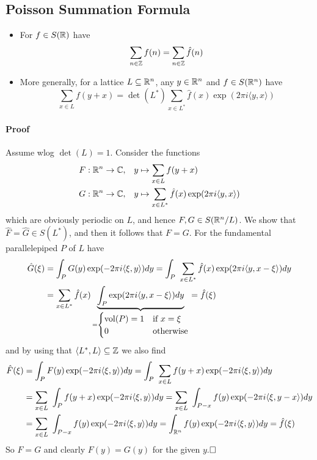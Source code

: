 \subsection{Poisson Summation Formula}
\begin{itemize}
    \item For $f \in S(\mathbb{R})$ have
    \begin{equation*}
        \sum_{n \in \mathbb{Z}} f(n) = \sum_{n \in \mathbb{Z}} \hat{f}(n)
    \end{equation*}
    \item More generally, for a lattice $L \subseteq \mathbb{R}^n$, any $y \in \mathbb{R}^n$ and $f \in S(\mathbb{R}^n)$ have
    \begin{equation*}
        \sum_{x \in L} f(y + x) = \det(L^*) \sum_{x \in L^*} \hat{f}(x) \exp(2\pi i \langle y, x \rangle)
    \end{equation*}
\end{itemize}
\paragraph{Proof} Assume wlog $\det(L) = 1$. Consider the functions
\begin{align*}
    F: \mathbb{R}^n \to \mathbb{C}, \quad &y \mapsto \sum_{x \in L} f(y + x) \\
    G: \mathbb{R}^n \to \mathbb{C}, \quad &y \mapsto \sum_{x \in L^*} \hat{f}(x)\exp(2\pi i\langle y, x \rangle)
\end{align*}
which are obviously periodic on $L$, and hence $F, G \in S(\mathbb{R}^n / L)$.
We show that $\hat{F} = \hat{G} \in S(L^*)$, and then it follows that $F = G$. For the fundamental parallelepiped $P$ of $L$ have
\begin{align*}
    \hat{G}(\xi) &= \int_P G(y) \exp(-2\pi i \langle \xi, y \rangle) dy = \int_P \ \sum_{x \in L^*} \hat{f}(x) \exp(2\pi i \langle y, x - \xi \rangle) dy \\
    &= \sum_{x \in L^*} \hat{f}(x) \underbrace{\int_P \exp(2\pi i \langle y, x - \xi \rangle) dy}_{= \begin{cases}
        \mathrm{vol}(P) = 1 & \text{if $x = \xi$} \\
        0 & \text{otherwise}
    \end{cases}} = \hat{f}(\xi)
\end{align*}
and by using that $\langle L^*, L \rangle \subseteq \mathbb{Z}$ we also find
\begin{align*}
    \hat{F}(\xi) &= \int_P F(y) \exp(-2\pi i \langle \xi, y \rangle) dy = \int_P \ \sum_{x \in L} f(y + x) \exp(-2\pi i \langle \xi, y \rangle) dy \\
    &= \sum_{x \in L} \ \int_P f(y + x) \exp(-2\pi i \langle \xi, y \rangle) dy = \sum_{x \in L} \ \int_{P - x} f(y) \exp(-2\pi i \langle \xi, y - x \rangle) dy \\
    &= \sum_{x \in L} \ \int_{P - x} f(y) \exp(-2\pi i \langle \xi, y \rangle) dy = \int_{\mathbb{R}^n} f(y)\exp(-2\pi i \langle \xi, y \rangle) dy = \hat{f}(\xi)
\end{align*}
So $F = G$ and clearly $F(y) = G(y)$ for the given $y$.$\hfill\square$

